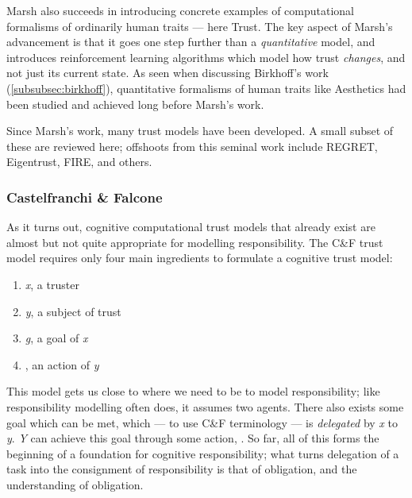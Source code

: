 Marsh also succeeds in introducing concrete examples of computational formalisms of ordinarily human traits --- here Trust. The key aspect of Marsh's advancement is that it goes one step further than a \emph{quantitative} model, and introduces reinforcement learning algorithms which model how trust \emph{changes}, and not just its current state. As seen when discussing Birkhoff's work (\cref{subsubsec:birkhoff}), quantitative formalisms of human traits like Aesthetics had been studied and achieved long before Marsh's work.\par

Since Marsh's work, many trust models have been developed. A small subset of these are reviewed here; offshoots from this seminal work include REGRET, Eigentrust, FIRE, and others.\par


\subsubsection{Castelfranchi \& Falcone}
As it turns out, cognitive computational trust models that already exist are almost but not quite appropriate for modelling responsibility. The C\&F trust model requires only four main ingredients to formulate a cognitive trust model:

\begin{enumerate}
    \item \emph{x}, a truster
    \item \emph{y}, a subject of trust
    \item \emph{g}, a goal of \emph{x}
    \item \emph{\safealpha}, an action of \emph{y}
\end{enumerate}\par

This model gets us close to where we need to be to model responsibility; like responsibility modelling often does, it assumes two agents. There also exists some goal which can be met, which --- to use C\&F terminology --- is \emph{delegated} by \emph{x} to \emph{y}. \emph{Y} can achieve this goal through some action, \emph{\safealpha}. So far, all of this forms the beginning of a foundation for cognitive responsibility; what turns delegation of a task into the consignment of responsibility is that of obligation, and the understanding of obligation. \par

